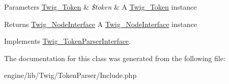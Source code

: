\begin{DoxyParams}[1]{Parameters}
\hyperlink{class_twig___token}{Twig\+\_\+\+Token} & {\em \$token} & A \hyperlink{class_twig___token}{Twig\+\_\+\+Token} instance\\
\hline
\end{DoxyParams}
\begin{DoxyReturn}{Returns}
\hyperlink{interface_twig___node_interface}{Twig\+\_\+\+Node\+Interface} A \hyperlink{interface_twig___node_interface}{Twig\+\_\+\+Node\+Interface} instance 
\end{DoxyReturn}


Implements \hyperlink{interface_twig___token_parser_interface_a5dfa2e269321584fb74e8b43dabe0efd}{Twig\+\_\+\+Token\+Parser\+Interface}.



The documentation for this class was generated from the following file\+:\begin{DoxyCompactItemize}
\item 
engine/lib/\+Twig/\+Token\+Parser/Include.\+php\end{DoxyCompactItemize}
